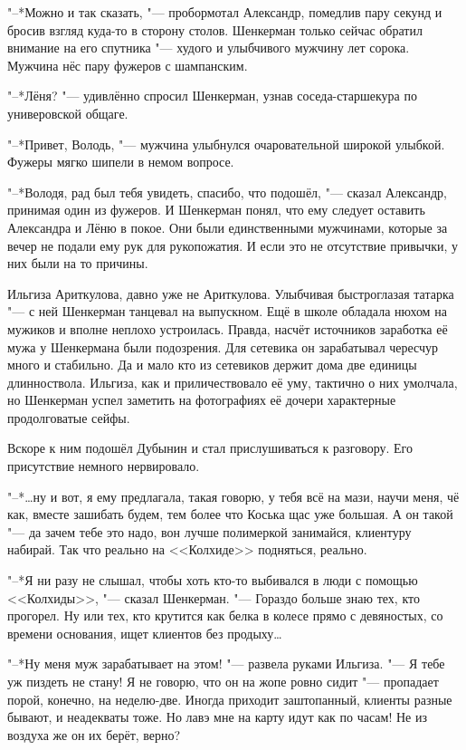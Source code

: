 "--*Можно и так сказать, "--- пробормотал Александр, помедлив пару секунд и бросив взгляд куда-то в сторону столов.
Шенкерман только сейчас обратил внимание на его спутника "--- худого и улыбчивого мужчину лет сорока.
Мужчина нёс пару фужеров с шампанским.

"--*Лёня? "--- удивлённо спросил Шенкерман, узнав соседа-старшекура по универовской общаге.

"--*Привет, Володь, "--- мужчина улыбнулся очаровательной широкой улыбкой.
Фужеры мягко шипели в немом вопросе.

"--*Володя, рад был тебя увидеть, спасибо, что подошёл, "--- сказал Александр, принимая один из фужеров.
И Шенкерман понял, что ему следует оставить Александра и Лёню в покое.
Они были единственными мужчинами, которые за вечер не подали ему рук для рукопожатия.
И если это не отсутствие привычки, у них были на то причины.

Ильгиза Ариткулова, давно уже не Ариткулова.
Улыбчивая быстроглазая татарка "--- с ней Шенкерман танцевал на выпускном.
Ещё в школе обладала нюхом на мужиков и вполне неплохо устроилась.
Правда, насчёт источников заработка её мужа у Шенкермана были подозрения.
Для сетевика он зарабатывал чересчур много и стабильно.
Да и мало кто из сетевиков держит дома две единицы длинноствола.
Ильгиза, как и приличествовало её уму, тактично о них умолчала, но Шенкерман успел заметить на фотографиях её дочери характерные продолговатые сейфы.

Вскоре к ним подошёл Дубынин и стал прислушиваться к разговору.
Его присутствие немного нервировало.

"--*\ldots{}ну и вот, я ему предлагала, такая говорю, у тебя всё на мази, научи меня, чё как, вместе зашибать будем, тем более что Коська щас уже большая.
А он такой "--- да зачем тебе это надо, вон лучше полимеркой занимайся, клиентуру набирай.
Так что реально на <<Колхиде>> подняться, реально.

"--*Я ни разу не слышал, чтобы хоть кто-то выбивался в люди с помощью <<Колхиды>>, "--- сказал Шенкерман.
"--- Гораздо больше знаю тех, кто прогорел.
Ну или тех, кто крутится как белка в колесе прямо с девяностых, со времени основания, ищет клиентов без продыху\ldots{}

"--*Ну меня муж зарабатывает на этом! "--- развела руками Ильгиза.
"--- Я тебе уж пиздеть не стану!
Я не говорю, что он на жопе ровно сидит "--- пропадает порой, конечно, на неделю-две.
Иногда приходит заштопанный, клиенты разные бывают, и неадекваты тоже.
Но лавэ мне на карту идут как по часам!
Не из воздуха же он их берёт, верно?

